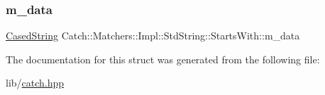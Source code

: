 \subsubsection{\texorpdfstring{m\+\_\+data}{m\_data}}
{\footnotesize\ttfamily \hyperlink{struct_catch_1_1_matchers_1_1_impl_1_1_std_string_1_1_cased_string}{Cased\+String} Catch\+::\+Matchers\+::\+Impl\+::\+Std\+String\+::\+Starts\+With\+::m\+\_\+data}



The documentation for this struct was generated from the following file\+:\begin{DoxyCompactItemize}
\item 
lib/\hyperlink{catch_8hpp}{catch.\+hpp}\end{DoxyCompactItemize}
